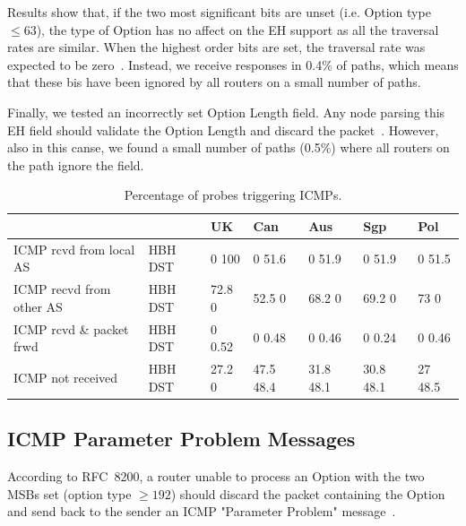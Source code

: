 \documentclass[conference]{IEEEtran}
\begin{document}
Results show that, if the two most significant bits are unset (i.e. Option type
$\le 63$), the type of Option has no affect on the EH support as all the
traversal rates are similar.  When the highest order bits are set, the
traversal rate was expected to be zero~\cite{RFC8200}.  Instead, we receive
responses in 0.4\% of paths, which means that these bis have been ignored by all
routers on a small number of paths.

Finally, we tested an incorrectly set Option Length field. Any node parsing
this EH field should validate the Option Length and discard the
packet~\cite{RFC8200}. However, also in this canse, we found a small number of
paths (0.5\%) where all routers on the path ignore the field.

\begin{table}[t]
\centering
\caption{Percentage of probes triggering ICMPs.}
\label{tbl:icmp_support_dst}
\begin{tabular}{l|p{}|
p{}|p{}|p{}|p{}|p{}}
                           &          & UK        & Can       & Aus    & Sgp          & Pol     \\
\hline
\hline
{ICMP rcvd from local AS}  & {HBH DST} & {0 100}  & {0 51.6}    & {0 51.9}    & {0 51.9}    & {0 51.5}  \\
\hline
{ICMP recvd from other AS} & {HBH DST} & {72.8 0} & {52.5 0}    & {68.2 0}    & {69.2 0}    & {73  0}   \\
\hline
{ICMP rcvd \& packet frwd} & {HBH DST} & {0 0.52} & {0 0.48}    & {0 0.46}    & {0 0.24}    & {0 0.46}  \\
\hline
{ICMP not received}        & {HBH DST} & {27.2 0} & {47.5 48.4} & {31.8 48.1} & {30.8 48.1} & {27 48.5} 
\end{tabular}
\end{table}


\subsection{ICMP Parameter Problem Messages}


According to RFC~8200, a router unable to process an Option with the two MSBs
set (option type $\ge 192$) should discard the packet containing the Option and
send back to the sender an ICMP "Parameter Problem" message~\cite{RFC8200}.
\end{document}
